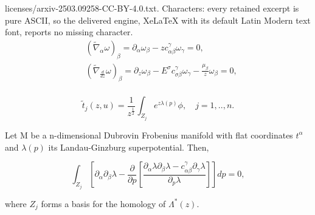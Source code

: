 \documentclass[10pt,a4paper]{amsart}
\begin{document}
licenses/arxiv-2503.09258-CC-BY-4.0.txt. Characters: every retained excerpt is pure ASCII, so the delivered engine, XeLaTeX with its default Latin Modern text font, reports no missing character.
 \begin{equation}\label{flat section Dubrovin connection}
 \begin{split}
&\left(\tilde \nabla_{\alpha} \omega\right)_{\beta}=\partial_{\alpha}\omega_{\beta}-zc_{\alpha\beta}^{\gamma}\omega_{\gamma}=0,\\
&\left(\tilde \nabla_{\frac{d}{dz}} \omega\right)_{\beta}=\partial_{z}\omega_{\beta}-E^{\sigma}c_{\sigma\beta}^{\gamma}\omega_{\gamma}-\frac{\mu_{\beta}}{z}\omega_{\beta}=0,\\
\end{split}
\end{equation}

\begin{equation}\label{Mirror symmetry}
\tilde t_j(z,u)=\frac{1}{z^{\frac{1}{2}}}\int_{Z_j} e^{z\lambda(p)}\phi, \quad j=1,..,n.
\end{equation}

\begin{lemma}
Let M be a n-dimensional Dubrovin Frobenius manifold with flat coordinates $t^{\alpha}$  and $\lambda(p)$ its Landau-Ginzburg superpotential. Then,
 
 \begin{equation}\label{second derivative of Hodge variation integral version}
\int_{Z_j}\left[\partial_{\alpha}\partial_{\beta}\lambda-\frac{\partial}{\partial p}\left[ \frac{ \partial_{\alpha}\lambda \partial_{\beta}\lambda-c_{\alpha\beta}^{\gamma}\partial_{\gamma}\lambda}{ \partial_{p}\lambda}  \right]\right] dp=0,
\end{equation}

where $Z_j$ forms a basis for the homology of $\Lambda^{*}(z)$.
\end{lemma}
\end{document}
